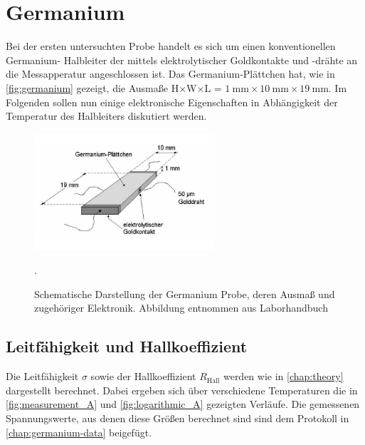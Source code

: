 
\section{Germanium}
\label{sec:germanium}

Bei der ersten untersuchten Probe handelt es sich um einen konventionellen Germanium-
Halbleiter der mittels elektrolytischer Goldkontakte und -drähte an die Messapperatur
angeschlossen ist. Das Germanium-Plättchen hat, wie in \autoref{fig:germanium} 
gezeigt, die Ausmaße H$\times$W$\times$L = $\SI{1}{\milli\meter}\times\SI{10}{\milli
\meter}\times\SI{19}{\milli\meter}$. Im Folgenden sollen nun einige elektronische
Eigenschaften in Abhängigkeit der Temperatur des Halbleiters diskutiert werden.

\begin{figure}
	\centering
	\includegraphics[width=0.6\textwidth]{./fig/germanium.png}
	\caption{Schematische Darstellung der Germanium Probe, deren Ausmaß und 
	zugehöriger Elektronik. Abbildung entnommen aus Laborhandbuch \cite{Manual}}.
	\label{fig:germanium}
\end{figure}

\subsection{Leitfähigkeit und Hallkoeffizient}
\label{ssec:leitfähigkeit}

Die Leitfähigkeit $\sigma$ sowie der Hallkoeffizient $R_\text{Hall}$ werden wie in 
\autoref{chap:theory} dargestellt berechnet. Dabei ergeben sich über verschiedene
Temperaturen die in \autoref{fig:measurement_A} und \autoref{fig:logarithmic_A} 
gezeigten Verläufe. Die gemessenen Spannungswerte, aus denen diese Größen berechnet 
sind sind dem Protokoll in \autoref{chap:germanium-data} beigefügt.

